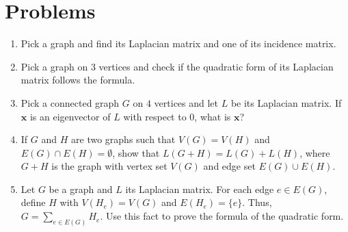 \documentclass{article}
\newcommand{\bx}{\mathbf{x}}
\theoremstyle{definition}
\begin{document}
\section*{Problems}
\begin{enumerate}
\setlength\itemsep{2em}
\item Pick a graph and find its Laplacian matrix and one of its incidence matrix.
\item Pick a graph on $3$ vertices and check if the quadratic form of its Laplacian matrix follows the formula.
\item Pick a connected graph $G$ on $4$ vertices and let $L$ be its Laplacian matrix.  If $\bx$ is an eigenvector of $L$ with respect to $0$, what is $\bx$?
\item If $G$ and $H$ are two graphs such that $V(G) = V(H)$ and $E(G) \cap E(H) = \emptyset$, show that $L(G + H) = L(G) + L(H)$, where $G + H$ is the graph with vertex set $V(G)$ and edge set $E(G) \cup E(H)$.
\item Let $G$ be a graph and $L$ its Laplacian matrix.  For each edge $e\in E(G)$, define $H$ with $V(H_e) = V(G)$ and $E(H_e) = \{e\}$.  Thus, $G = \sum_{e\in E(G)} H_e$.  Use this fact to prove the formula of the quadratic form.
\end{enumerate}

\end{document}
